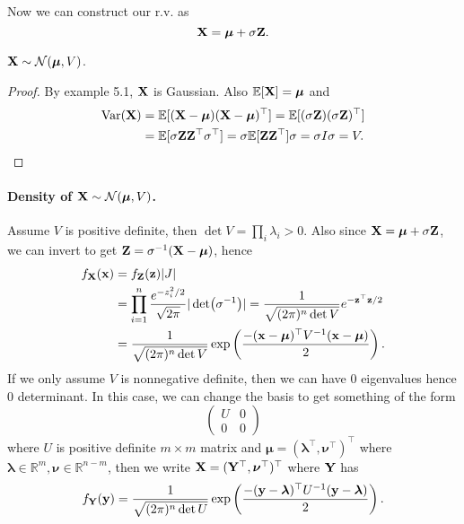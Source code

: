 Now we can construct our r.v. as 
\[
    {\bf X} = \boldsymbol{\mu}+ \sigma {\bf Z}.
\]
\begin{claim}
    $ {\bf X} \sim {\mathcal{N}}(\boldsymbol{\mu},V) $.
\end{claim}
\begin{proof}
    By example 5.1, ${\bf X}$ is Gaussian. Also $ {\mathbb{E}}[{\bf X}]=\boldsymbol{\mu} $ and
    \begin{align*}
        \operatorname{Var}({\bf X})&= {\mathbb{E}}[({\bf X}-\boldsymbol{\mu})({\bf X}-\boldsymbol{\mu})^\top]={\mathbb{E}}[(\sigma{\bf Z})(\sigma{\bf Z})^\top ]\\ 
        &= {\mathbb{E}}[\sigma{\bf Z} {\bf Z}^\top \sigma^\top ] = \sigma {\mathbb{E}}[{\bf Z} {\bf Z}^\top]\sigma = \sigma I \sigma = V.\qedhere
    \end{align*}
\end{proof}

\paragraph{Density of $ {\bf X} \sim {\mathcal{N}}(\boldsymbol{\mu},V) $.} Assume $V$ is positive definite, then $\det V=\prod_i\lambda_i>0$. Also since ${\bf X}=\boldsymbol{\mu}+\sigma {\bf Z}$, we can invert to get ${\bf Z}=\sigma^{-1}({\bf X}-\boldsymbol{\mu})$, hence
\begin{align*}
    f_{\bf X}({\bf x})&=f_{\bf Z}({\bf z})|J|\\
    &=\prod_{i=1}^n\frac{e^{-z_i^2/2}}{\sqrt{2\pi}}|\det(\sigma^{-1})|=\frac{1}{\sqrt{(2\pi)^n\det V}}e^{-{\bf z}^\top {\bf z}/2}\\
    &=\frac{1}{\sqrt{(2\pi)^n\det V}}\exp \left( \frac{-({\bf x}-\boldsymbol{\mu})^\top V^{-1}({\bf x}-\boldsymbol{\mu})}{2} \right).
\end{align*}
If we only assume $V$ is nonnegative definite, then we can have $0$ eigenvalues hence $0$ determinant.
In this case, we can change the basis to get something of the form
$$\begin{pmatrix}
    U&0\\
    0&0
\end{pmatrix}$$
where $U$ is positive definite $m\times m$ matrix and $\boldsymbol{\mu}=(\boldsymbol{\lambda}^\top,\boldsymbol{\nu}^\top)^\top$ where $\boldsymbol{\lambda}\in\mathbb R^m,\boldsymbol{\nu}\in\mathbb R^{n-m}$, then we write ${\bf X}=({\bf Y}^\top,\boldsymbol{\nu}^\top)^\top$ where ${\bf Y}$ has
$$f_{\bf Y}({\bf y})=\frac{1}{\sqrt{(2\pi)^n\det U}}\exp \left( \frac{-({\bf y}-\boldsymbol{\lambda})^\top U^{-1}({\bf y}-\boldsymbol{\lambda})}{2} \right).$$